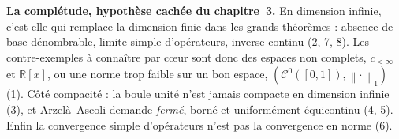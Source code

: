 \documentclass[11pt,a4paper]{article}
\newcommand{\R}{\mathbb{R}}
\newcommand{\norm}[1]{\left\|#1\right\|}
\newcommand{\Cz}{\mathcal{C}^0}
\theoremstyle{definition}
\begin{document}
\begin{piege}
\textbf{La complétude, hypothèse cachée du chapitre~3.} En dimension infinie, c'est elle qui remplace la dimension finie dans les grands théorèmes : absence de base dénombrable, limite simple d'opérateurs, inverse continu (2, 7, 8). Les contre-exemples à connaître par cœur sont donc des espaces non complets, $c_{<\infty}$ et $\R[x]$, ou une norme trop faible sur un bon espace, $(\Cz([0,1]),\norm\cdot_1)$ (1). Côté compacité : la boule unité n'est jamais compacte en dimension infinie (3), et Arzelà--Ascoli demande \emph{fermé}, borné et uniformément équicontinu (4, 5). Enfin la convergence simple d'opérateurs n'est pas la convergence en norme (6).
\end{piege}

\end{document}
